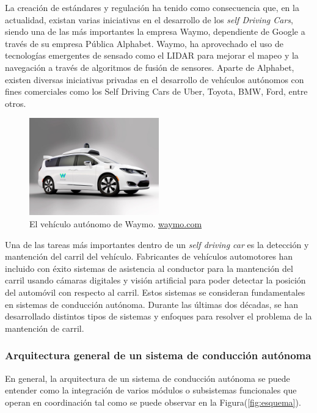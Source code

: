 La creación de estándares y regulación ha tenido como consecuencia que, en la actualidad, existan varias iniciativas 
en el desarrollo de los \textit{self Driving Cars}, siendo una de las más 
importantes la empresa Waymo, dependiente de Google a través de su empresa Pública Alphabet. Waymo, ha aprovechado 
el uso de tecnologías emergentes de sensado como el LIDAR para mejorar el mapeo y la navegación a través de algoritmos 
de fusión de sensores. Aparte de Alphabet, existen diversas iniciativas privadas en el desarrollo de vehículos autónomos 
con fines comerciales como los Self Driving Cars de Uber, Toyota, BMW, Ford, entre otros.


\begin{figure}[!h] 
\centering
\includegraphics[width=0.5\textwidth]{img/waymo}
\caption[Vehículo de Waymo]{El vehículo autónomo de Waymo. 
        \href{https://waymo.com/}{waymo.com}}
\label{fig:waymo}
\end{figure}

Una de las tareas más importantes dentro de un \textit{self driving car} es la detección y mantención del carril del 
vehículo. Fabricantes de vehículos automotores han incluido con éxito sistemas de asistencia al conductor para la 
mantención del carril usando cámaras digitales y visión artificial para poder detectar la posición del automóvil con 
respecto al carril. Estos sistemas se consideran fundamentales en sistemas de conducción autónoma. Durante las últimas 
dos décadas, se han desarrollado distintos tipos de sistemas y enfoques para resolver el problema de la mantención de 
carril.

\subsubsection{Arquitectura general de un sistema de conducción autónoma}
En general, la arquitectura de un sistema de conducción autónoma se puede entender como la integración de varios módulos o 
subsistemas funcionales que operan en coordinación tal como se puede observar en la Figura(\ref{fig:esquema}). 

